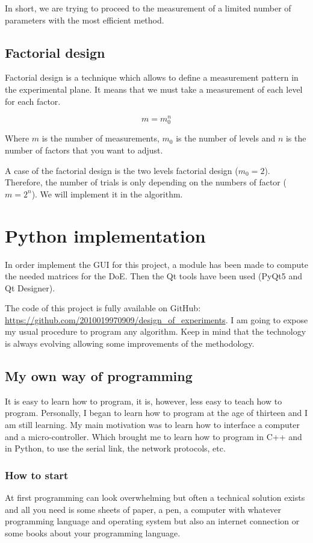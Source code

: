 \documentclass[english, 12 pt, openany, oneside]{book}
\begin{document}
In short, we are trying to proceed to the measurement of a limited number of parameters with the most efficient method.

\section{Factorial design}
Factorial design is a technique which allows to define a measurement pattern in the experimental plane. It means that we must take a measurement of each level for each factor.

\begin{equation}
m = m_0^{n}
\end{equation}

Where $m$ is the number of measurements, $m_0$ is the number of levels and $n$ is the number of factors that you want to adjust.

A case of the factorial design is the two levels factorial design ($m_0 = 2$). Therefore, the number of trials is only depending on the numbers of factor ($m = 2^n$). We will implement it in the algorithm.


\chapter{Python implementation}
In order implement the GUI for this project, a module has been made to compute the needed matrices for the DoE. Then the Qt tools have been used (PyQt5 and Qt Designer).

The code of this project is fully available on GitHub:\\ \url{https://github.com/2010019970909/design_of_experiments}.
I am going to expose my usual procedure to program any algorithm. Keep in mind that the technology is always evolving allowing some improvements of the methodology.

\section{My own way of programming}
It is easy to learn how to program, it is, however, less easy to teach how to program. Personally, I began to learn how to program at the age of thirteen and I am still learning. My main motivation was to learn how to interface a computer and a micro-controller. Which brought me to learn how to program in C++ and in Python, to use the serial link, the network protocols, etc.

\subsection{How to start}
At first programming can look overwhelming but often a technical solution exists and all you need is some sheets of paper, a pen, a computer with whatever programming language and operating system but also an internet connection or some books about your programming language.
\end{document}

